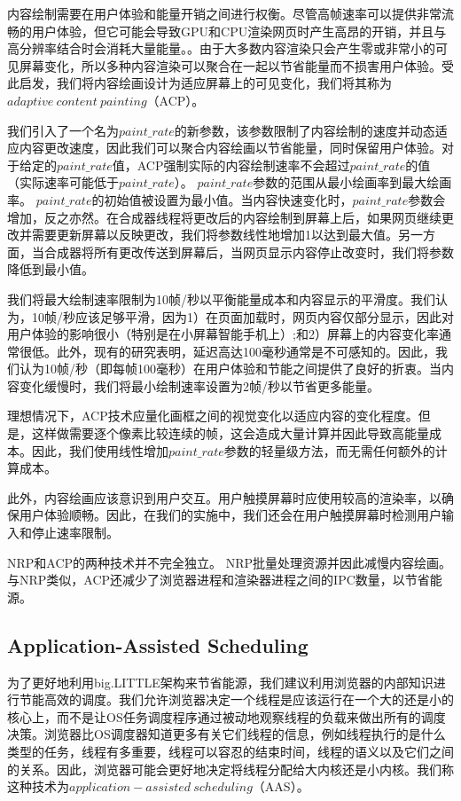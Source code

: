 \documentclass{sig-alternate-05-2015}
\begin{document}
内容绘制需要在用户体验和能量开销之间进行权衡。尽管高帧速率可以提供非常流畅的用户体验，但它可能会导致GPU和CPU渲染网页时产生高昂的开销，并且与高分辨率结合时会消耗大量能量\cite{12}。。由于大多数内容渲染只会产生零或非常小的可见屏幕变化，所以多种内容渲染可以聚合在一起以节省能量而不损害用户体验。受此启发，我们将内容绘画设计为适应屏幕上的可见变化，我们将其称为$adaptive\ content\ painting$（ACP）\cite{1}。

我们引入了一个名为$paint\_rate$的新参数，该参数限制了内容绘制的速度并动态适应内容更改速度，因此我们可以聚合内容绘画以节省能量，同时保留用户体验。对于给定的$paint\_rate$值，ACP强制实际的内容绘制速率不会超过$paint\_rate$的值（实际速率可能低于$paint\_rate$）。 $paint\_rate$参数的范围从最小绘画率到最大绘画率。 $paint\_rate$的初始值被设置为最小值。当内容快速变化时，$paint\_rate$参数会增加，反之亦然。在合成器线程将更改后的内容绘制到屏幕上后，如果网页继续更改并需要更新屏幕以反映更改，我们将参数线性地增加1以达到最大值。另一方面，当合成器将所有更改传送到屏幕后，当网页显示内容停止改变时，我们将参数降低到最小值。

我们将最大绘制速率限制为10帧/秒以平衡能量成本和内容显示的平滑度。我们认为，10帧/秒应该足够平滑，因为1）在页面加载时，网页内容仅部分显示，因此对用户体验的影响很小（特别是在小屏幕智能手机上）;和2）屏幕上的内容变化率通常很低。此外，现有的研究\cite{39}表明，延迟高达100毫秒通常是不可感知的。因此，我们认为10帧/秒（即每帧100毫秒）在用户体验和节能之间提供了良好的折衷。当内容变化缓慢时，我们将最小绘制速率设置为2帧/秒以节省更多能量。

理想情况下，ACP技术应量化画框之间的视觉变化以适应内容的变化程度。但是，这样做需要逐个像素比较连续的帧，这会造成大量计算并因此导致高能量成本。因此，我们使用线性增加$paint\_rate$参数的轻量级方法，而无需任何额外的计算成本。

此外，内容绘画应该意识到用户交互。用户触摸屏幕时应使用较高的渲染率，以确保用户体验顺畅。因此，在我们的实施中，我们还会在用户触摸屏幕时检测用户输入和停止速率限制。

NRP和ACP的两种技术并不完全独立。 NRP批量处理资源并因此减慢内容绘画。与NRP类似，ACP还减少了浏览器进程和渲染器进程之间的IPC数量，以节省能源。


\subsection{Application-Assisted Scheduling}

为了更好地利用big.LITTLE架构来节省能源，我们建议利用浏览器的内部知识进行节能高效的调度。我们允许浏览器决定一个线程是应该运行在一个大的还是小的核心上，而不是让OS任务调度程序通过被动地观察线程的负载来做出所有的调度决策。浏览器比OS调度器知道更多有关它们线程的信息，例如线程执行的是什么类型的任务，线程有多重要，线程可以容忍的结束时间，线程的语义以及它们之间的关系。因此，浏览器可能会更好地决定将线程分配给大内核还是小内核。我们称这种技术为$application-assisted\ scheduling$（AAS）\cite{1}。
\end{document}
